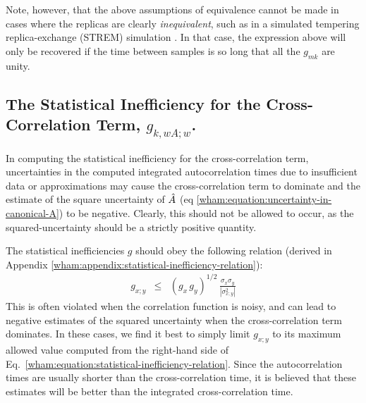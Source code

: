 Note, however, that the above assumptions of equivalence cannot be made in cases where the replicas are clearly \emph{inequivalent}, such as in a simulated tempering replica-exchange (STREM) simulation \cite{mitsutake:2000a,mitsutake:2004a}.  In that case, the expression above will only be recovered if the time between samples is so long that all the $g_{mk}$ are unity.

\subsection{The Statistical Inefficiency for the Cross-Correlation Term, $g_{k,wA;w}$.}

In computing the statistical inefficiency for the cross-correlation term, uncertainties in the computed integrated autocorrelation times due to insufficient data or approximations may cause the cross-correlation term to dominate and the estimate of the square uncertainty of $\hat{A}$ (eq \ref{wham:equation:uncertainty-in-canonical-A}) to be negative.  Clearly, this should not be allowed to occur, as the squared-uncertainty should be a strictly positive quantity.

The statistical inefficiencies $g$ should obey the following relation (derived in Appendix \ref{wham:appendix:statistical-inefficiency-relation}):
\begin{eqnarray}
g_{x;y} &\le& ( g_x \, g_y )^{1/2} \, \frac{\sigma_x \sigma_y}{|\sigma^2_{x;y}|} \label{wham:equation:statistical-inefficiency-relation}
\end{eqnarray}
This is often violated when the correlation function is noisy, and can lead to negative estimates of the squared uncertainty when the cross-correlation term dominates.  In these cases, we find it best to simply limit $g_{x;y}$ to its maximum allowed value computed from the right-hand side of Eq.\ \ref{wham:equation:statistical-inefficiency-relation}.  Since the autocorrelation times are usually shorter than the cross-correlation time, it is believed that these estimates will be better than the integrated cross-correlation time.

